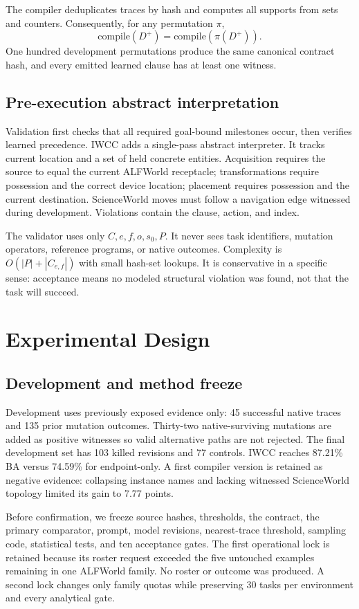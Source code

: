 \documentclass[10pt]{article}
\begin{document}
The compiler deduplicates traces by hash and computes all supports from sets and counters. Consequently, for any permutation $\pi$,
\[
\mathrm{compile}(D^+)=\mathrm{compile}(\pi(D^+)).
\]
One hundred development permutations produce the same canonical contract hash, and every emitted learned clause has at least one witness.

\subsection{Pre-execution abstract interpretation}
Validation first checks that all required goal-bound milestones occur, then verifies learned precedence. IWCC adds a single-pass abstract interpreter. It tracks current location and a set of held concrete entities. Acquisition requires the source to equal the current ALFWorld receptacle; transformations require possession and the correct device location; placement requires possession and the current destination. ScienceWorld moves must follow a navigation edge witnessed during development. Violations contain the clause, action, and index.

The validator uses only $C,e,f,o,s_0,P$. It never sees task identifiers, mutation operators, reference programs, or native outcomes. Complexity is $O(|P|+|C_{e,f}|)$ with small hash-set lookups. It is conservative in a specific sense: acceptance means no modeled structural violation was found, not that the task will succeed.

\section{Experimental Design}
\subsection{Development and method freeze}
Development uses previously exposed evidence only: 45 successful native traces and 135 prior mutation outcomes. Thirty-two native-surviving mutations are added as positive witnesses so valid alternative paths are not rejected. The final development set has 103 killed revisions and 77 controls. IWCC reaches 87.21\% BA versus 74.59\% for endpoint-only. A first compiler version is retained as negative evidence: collapsing instance names and lacking witnessed ScienceWorld topology limited its gain to 7.77 points.

Before confirmation, we freeze source hashes, thresholds, the contract, the primary comparator, prompt, model revisions, nearest-trace threshold, sampling code, statistical tests, and ten acceptance gates. The first operational lock is retained because its roster request exceeded the five untouched examples remaining in one ALFWorld family. No roster or outcome was produced. A second lock changes only family quotas while preserving 30 tasks per environment and every analytical gate.
\end{document}
